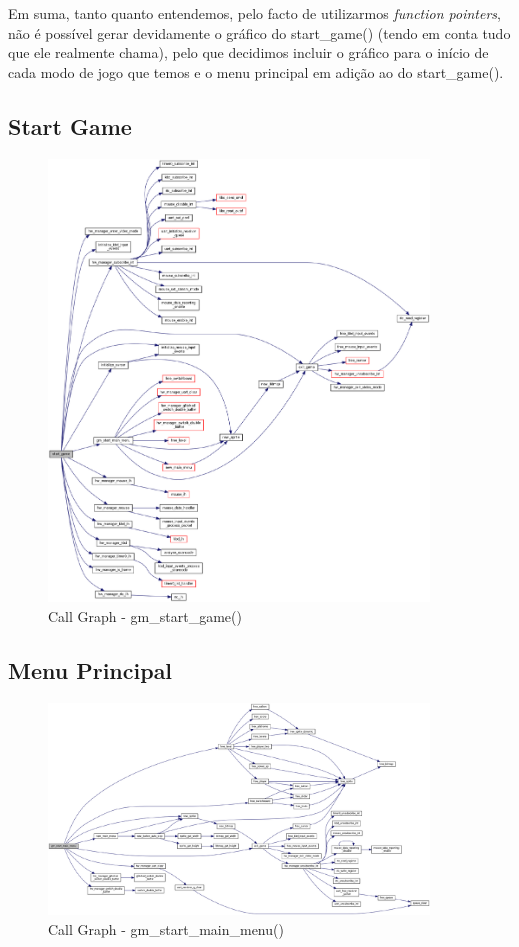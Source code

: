 \documentclass{report}
\begin{document}
Em suma, tanto quanto entendemos, pelo facto de utilizarmos \textit{function pointers}, não é possível gerar devidamente o gráfico do start\_game() (tendo em conta tudo que ele realmente chama), pelo que decidimos incluir o gráfico para o início de cada modo de jogo que temos e o menu principal em adição ao do start\_game().

\subsection{Start Game}

\begin{figure}[H]
	\centering
	\includegraphics[width=0.9\textwidth]{gm_start_game}
	\caption{Call Graph - gm\_start\_game()}
\end{figure}

\subsection{Menu Principal}

\begin{figure}[H]
	\centering
	\includegraphics[width=0.9\textwidth]{gm_start_main_menu}
	\caption{Call Graph - gm\_start\_main\_menu()}
\end{figure}
\end{document}
